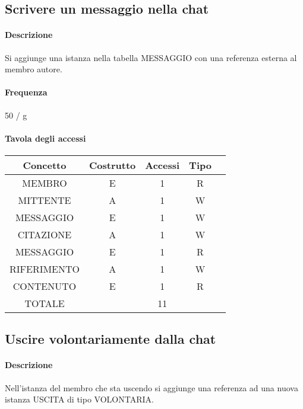 \documentclass[a4paper,12pt]{report}
\begin{document}
\subsection{Scrivere un messaggio nella chat} \label{scrivere_messaggio}
\paragraph{Descrizione} Si aggiunge una istanza nella tabella MESSAGGIO con una referenza esterna al membro autore.
\paragraph{Frequenza} 50 / g 
\begin{table}[H]
\paragraph{Tavola degli accessi\newline}
\begin{tabular}{|c|c|c|c|c|}
\hline
Concetto    & Costrutto & Accessi & Tipo \\ \hline
MEMBRO      & E         & 1       & R    \\ \hline
MITTENTE    & A         & 1       & W    \\ \hline
MESSAGGIO   & E         & 1       & W    \\ \hline
CITAZIONE   & A         & 1       & W    \\ \hline
MESSAGGIO   & E         & 1       & R    \\ \hline
RIFERIMENTO & A         & 1       & W    \\ \hline
CONTENUTO   & E         & 1       & R    \\ \hline
TOTALE      &           & 11      &      \\ \hline
\end{tabular}
\end{table}
\subsection{Uscire volontariamente dalla chat} \label{uscire_volontariamente}
\paragraph{Descrizione} Nell'istanza del membro che sta uscendo si aggiunge una referenza ad una nuova istanza USCITA di tipo VOLONTARIA.
\end{document}
